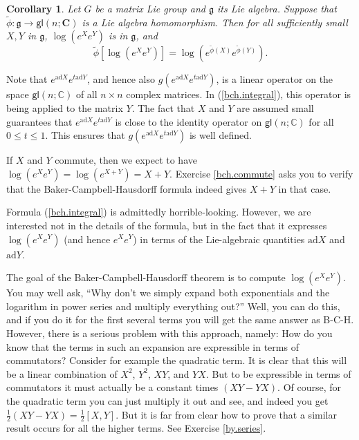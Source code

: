 \documentclass[12pt]{amsbook}
\let \frak = \mathfrak
\theoremstyle{plain}
\newtheorem{corollary}[theorem]{Corollary}
\numberwithin{equation}{chapter}
\numberwithin{theorem}{chapter}
\begin{document}
\begin{corollary}
\label{local.homo}Let $G$ be a matrix Lie group and $\frak{g}$ its Lie
algebra. Suppose that $\widetilde{\phi}:\frak{g}\rightarrow\mathsf{gl}%
(n;\mathbf{C})$ is a Lie algebra homomorphism. Then for all sufficiently small
$X,Y$ in $\frak{g}$, $\log\left(  e^{X}e^{Y}\right)  $ is in $\frak{g}$, and
\begin{equation}
\widetilde{\phi}\left[  \log\left(  e^{X}e^{Y}\right)  \right]  =\log\left(
e^{\widetilde{\phi}(X)}e^{\widetilde{\phi}(Y)}\right)  \text{.}\label{switch2}%
\end{equation}
\end{corollary}

Note that $e^{\mathrm{ad}X}e^{t\mathrm{ad}Y}$, and hence also
$g(e^{\mathrm{ad}X}e^{t\mathrm{ad}Y})$, is a linear operator on the space
$\mathsf{gl}(n;\mathbb{C})$ of all $n\times n$ complex matrices. In
(\ref{bch.integral}), this operator is being applied to the matrix $Y$. The
fact that $X$ and $Y$ are assumed small guarantees that $e^{\mathrm{ad}%
X}e^{t\mathrm{ad}Y}$ is close to the identity operator on $\mathsf{gl}%
(n;\mathbb{C})$ for all $0\leq t\leq1$. This ensures that $g(e^{\mathrm{ad}%
X}e^{t\mathrm{ad}Y})$ is well defined.

If $X$ and $Y$ commute, then we expect to have $\log\left(  e^{X}e^{Y}\right)
=\log(e^{X+Y})=X+Y$. Exercise \ref{bch.commute} asks you to verify that the
Baker-Campbell-Hausdorff formula indeed gives $X+Y$ in that case.

Formula (\ref{bch.integral}) is admittedly horrible-looking. However, we are
interested not in the details of the formula, but in the fact that it
expresses $\log\left(  e^{X}e^{Y}\right)  $ (and hence $e^{X}e^{Y}$) in terms
of the Lie-algebraic quantities $\mathrm{ad}X$ and $\mathrm{ad}Y$.

The goal of the Baker-Campbell-Hausdorff theorem is to compute $\log\left(
e^{X}e^{Y}\right)  $. You may well ask, ``Why don't we simply expand both
exponentials and the logarithm in power series and multiply everything out?''
Well, you can do this, and if you do it for the first several terms you will
get the same answer as B-C-H. However, there is a serious problem with this
approach, namely: How do you know that the terms in such an expansion are
expressible in terms of commutators? Consider for example the quadratic term.
It is clear that this will be a linear combination of $X^{2}$, $Y^{2}$, $XY$,
and $YX$. But to be expressible in terms of commutators it must actually be a
constant times $\left(  XY-YX\right)  $. Of course, for the quadratic term you
can just multiply it out and see, and indeed you get $\frac12\left(
XY-YX\right)  =\frac12\left[  X,Y\right]  $. But it is far from clear how to
prove that a similar result occurs for all the higher terms. See Exercise
\ref{by.series}.
\end{document}
